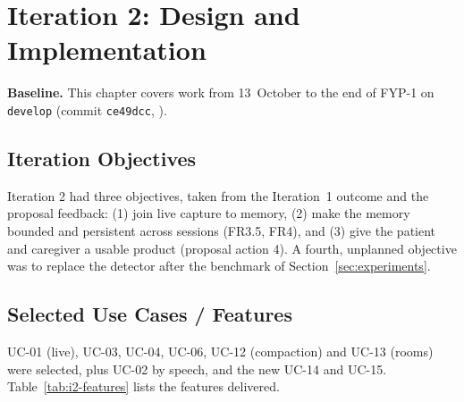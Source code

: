 \chapter{Iteration 2: Design and Implementation}
\label{chap:iter2}
\textbf{Baseline.} This chapter covers work from 13~October to the end of FYP-1
on \texttt{develop} (commit \texttt{ce49dcc}, ).

\section{Iteration Objectives}
Iteration 2 had three objectives, taken from the Iteration~1 outcome and the
proposal feedback: (1) join live capture to memory, (2) make the memory bounded
and persistent across sessions (FR3.5, FR4), and (3) give the patient and
caregiver a usable product (proposal action 4). A fourth, unplanned objective
was to replace the detector after the benchmark of Section~\ref{sec:experiments}.

\section{Selected Use Cases / Features}
UC-01 (live), UC-03, UC-04, UC-06, UC-12 (compaction) and UC-13 (rooms) were
selected, plus UC-02 by speech, and the new UC-14 and UC-15.
Table~\ref{tab:i2-features} lists the features delivered.

